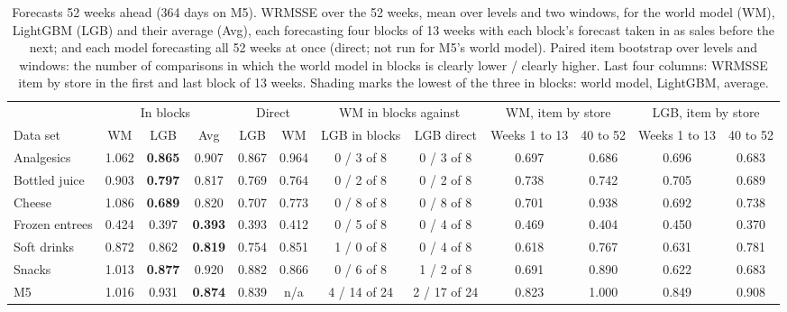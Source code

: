 \begin{table}[t]
\centering\footnotesize\setlength{\tabcolsep}{3pt}
\caption{Forecasts 52 weeks ahead (364 days on M5). WRMSSE over the 52 weeks, mean over levels and two windows, for
the world model (WM), LightGBM (LGB) and their average (Avg), each forecasting four blocks of 13 weeks with each block's
forecast taken in as sales before the next; and each model forecasting all 52 weeks at once (direct; not run for M5's
world model). Paired item bootstrap over levels and windows: the number of comparisons in which the world model in
blocks is clearly lower / clearly higher. Last four columns: WRMSSE item by store in the first and last block of 13
weeks. Shading marks the lowest of the three in blocks: \colorbox{wmcell}{world model}, \colorbox{lgbcell}{LightGBM},
\colorbox{avgcell}{average}.}
\label{tab:long-horizon}
\begin{adjustbox}{max width=\textwidth}\begin{tabular}{l ccc cc cc cc cc}
\toprule
 & \multicolumn{3}{c}{In blocks} & \multicolumn{2}{c}{Direct} & \multicolumn{2}{c}{WM in blocks against} & \multicolumn{2}{c}{WM, item by store} & \multicolumn{2}{c}{LGB, item by store}\\
\cmidrule(lr){2-4}\cmidrule(lr){5-6}\cmidrule(lr){7-8}\cmidrule(lr){9-10}\cmidrule(lr){11-12}
Data set & WM & LGB & Avg & LGB & WM & LGB in blocks & LGB direct & Weeks 1 to 13 & 40 to 52 & Weeks 1 to 13 & 40 to 52\\
\midrule
Analgesics & 1.062 & \cellcolor{lgbcell}\textbf{0.865} & 0.907 & 0.867 & 0.964 & 0 / 3 of 8 & 0 / 3 of 8 & 0.697 & 0.686 & 0.696 & 0.683 \\
Bottled juice & 0.903 & \cellcolor{lgbcell}\textbf{0.797} & 0.817 & 0.769 & 0.764 & 0 / 2 of 8 & 0 / 2 of 8 & 0.738 & 0.742 & 0.705 & 0.689 \\
Cheese & 1.086 & \cellcolor{lgbcell}\textbf{0.689} & 0.820 & 0.707 & 0.773 & 0 / 8 of 8 & 0 / 8 of 8 & 0.701 & 0.938 & 0.692 & 0.738 \\
Frozen entrees & 0.424 & 0.397 & \cellcolor{avgcell}\textbf{0.393} & 0.393 & 0.412 & 0 / 5 of 8 & 0 / 4 of 8 & 0.469 & 0.404 & 0.450 & 0.370 \\
Soft drinks & 0.872 & 0.862 & \cellcolor{avgcell}\textbf{0.819} & 0.754 & 0.851 & 1 / 0 of 8 & 0 / 4 of 8 & 0.618 & 0.767 & 0.631 & 0.781 \\
Snacks & 1.013 & \cellcolor{lgbcell}\textbf{0.877} & 0.920 & 0.882 & 0.866 & 0 / 6 of 8 & 1 / 2 of 8 & 0.691 & 0.890 & 0.622 & 0.683 \\
M5 & 1.016 & 0.931 & \cellcolor{avgcell}\textbf{0.874} & 0.839 & n/a & 4 / 14 of 24 & 2 / 17 of 24 & 0.823 & 1.000 & 0.849 & 0.908 \\
\bottomrule
\end{tabular}\end{adjustbox}
\end{table}
